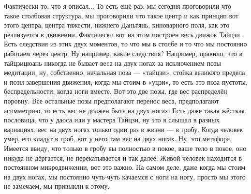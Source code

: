 Фактически
то, что я описал... То есть ещё раз: мы сегодня проговорили что такое столбовая структура, мы
проговорили что такое центр и как принцип вот этого центра, центра тяжести, нижнего Даньтянь,
киноварного поля, как это реализуется в движении. Фактически вот на этом построен весь движок
Тайцзи. Есть следствия из этих двух моментов, то что мы в столбе и то что мы постоянно
работаем через центр. Ну например, какие следствия? Например, правило, что в тайцзицюань
никогда не бывает веса на двух ногах за исключением позы медитации, ну, собственно, начальная
поза --- «тайцзи», стойка великого предела, и позы завершения движения, когда мы стоим в «уцзи», то
есть это поза пустоты, беспредельности, когда ноги вместе. Вот это две позы, где вес распределён
поровну. Все остальные позы предполагают перенос веса, предполагают асимметрию, то есть вес не
должен быть на двух ногах. Есть даже такая жёсткая пословица, что у даоса или у мастера
Тайцзи, ну это я слышал в разных вариациях, вес на двух ногах только один раз в жизни --- в гробу.
Когда человек умер, его кладут в гроб, вот у него там вес на двух ногах.
Ну, это метафора. Имеется ввиду,
что только в гробу вы полностью в покое, ваше тело в покое, оно никуда не дёргается, не
перекатывается и так далее. Живой человек находится в постоянном микродвижении, вот это важно.
На самом деле, даже когда мы стоим на двух ногах, мы постоянно чуть-чуть качаемся с ноги на
ногу, просто мы этого не замечаем, мы привыкли к этому.

